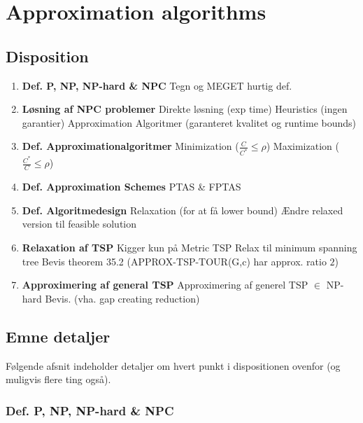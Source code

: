 \section{Approximation algorithms}

\subsection{Disposition}

\begin{enumerate}
 \item \textbf{Def. P, NP, NP-hard \& NPC}
    \subitem  Tegn og MEGET hurtig def.
 \item \textbf{Løsning af NPC problemer}
    \subitem Direkte løsning (exp time)
    \subitem Heuristics (ingen garantier)
    \subitem Approximation Algoritmer (garanteret kvalitet og runtime bounds)
 \item \textbf{Def. Approximationalgoritmer}
    \subitem Minimization ($\frac{C}{C^*} \leq \rho$)
    \subitem Maximization ($\frac{C^*}{C} \leq \rho$)
 \item \textbf{Def. Approximation Schemes}
    \subitem PTAS \& FPTAS
 \item \textbf{Def. Algoritmedesign}
    \subitem Relaxation (for at få lower bound)
    \subitem Ændre relaxed version til feasible solution
 \item \textbf{Relaxation af TSP}
    \subitem Kigger kun på Metric TSP
    \subitem Relax til minimum spanning tree
    \subitem Bevis theorem 35.2 (APPROX-TSP-TOUR(G,c) har approx. ratio $2$)
 \item \textbf{Approximering af general TSP}
    \subitem Approximering af generel TSP $\in$ NP-hard
    \subitem Bevis. (vha. gap creating reduction)
\end{enumerate}

\subsection{Emne detaljer}

Følgende afsnit indeholder detaljer om hvert punkt i dispositionen ovenfor (og muligvis flere ting også).

\subsubsection{Def. P, NP, NP-hard \& NPC}

